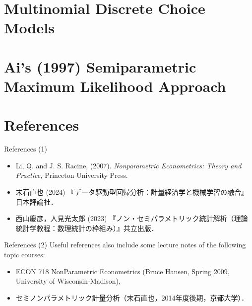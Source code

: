 \documentclass[xcolor=svgnames,dvipdfmx,cjk]{beamer}
\theoremstyle{example}
\begin{document}
\section{Multinomial Discrete Choice Models}









\section{Ai's (1997) Semiparametric Maximum Likelihood Approach}










\section{References}


\begin{frame}{References (1)}
  \begin{itemize}
    \item Li, Q. and J. S. Racine, (2007). 
          \textit{Nonparametric Econometrics: Theory and Practice,} 
          Princeton University Press.
    \item 末石直也 (2024) 『データ駆動型回帰分析：計量経済学と機械学習の融合』日本評論社．
    \item 西山慶彦，人見光太郎 (2023) 『ノン・セミパラメトリック統計解析（理論統計学教程：数理統計の枠組み）』共立出版．
  \end{itemize}
\end{frame}

\begin{frame}{References (2)}
\quad 
Useful references also include some lecture notes of the following topic courses:
  \begin{itemize}
    \item ECON 718 NonParametric Econometrics (Bruce Hansen, Spring 2009, University of Wisconsin-Madison),
    \item セミノンパラメトリック計量分析（末石直也，2014年度後期，京都大学）．
  \end{itemize}
\end{frame}
\end{document}
